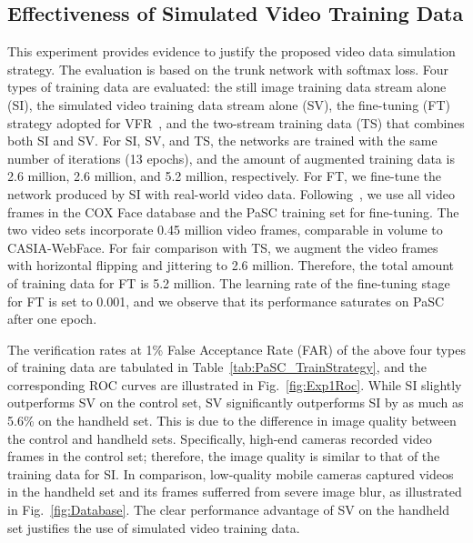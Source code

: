 \documentclass[10pt,journal,cspaper,compsoc]{IEEEtran}
\begin{document}
\subsection{Effectiveness of Simulated Video Training Data}
This experiment provides evidence to justify the proposed video data simulation strategy.
The evaluation is based on the trunk network with softmax loss.
Four types of training data are evaluated: the still image training data stream alone (SI), the simulated video training data stream alone (SV),
the fine-tuning (FT) strategy adopted for VFR~\cite{Ross2015report},
and the two-stream training data (TS) that combines both SI and SV.
For SI, SV, and TS, the networks are trained with the same number of iterations (13 epochs),
and the amount of augmented training data is 2.6 million, 2.6 million, and 5.2 million, respectively.
For FT, we fine-tune the network produced by SI with real-world video data.
Following~\cite{Ross2015report}, we use all video frames in the COX Face database and the PaSC training set for fine-tuning.
The two video sets incorporate 0.45 million video frames, comparable in volume to CASIA-WebFace.
For fair comparison with TS, we augment the video frames with horizontal flipping and jittering to 2.6 million.
Therefore, the total amount of training data for FT is 5.2 million.
The learning rate of the fine-tuning stage for FT is set to 0.001, and we observe that its performance saturates on PaSC after one epoch.

The verification rates at 1\% False Acceptance Rate (FAR) of the above four types of training data are tabulated in Table~\ref{tab:PaSC_TrainStrategy},
and the corresponding ROC curves are illustrated in Fig.~\ref{fig:Exp1Roc}.
While SI slightly outperforms SV on the control set, SV significantly outperforms SI by as much as 5.6\% on the handheld set.
This is due to the difference in image quality between the control and handheld sets.
Specifically, high-end cameras recorded video frames in the control set; therefore, the image quality is similar to that of the training data for SI.
In comparison, low-quality mobile cameras captured videos in the handheld set and its frames sufferred from severe image blur,
as illustrated in Fig.~\ref{fig:Database}.
The clear performance advantage of SV on the handheld set justifies the use of simulated video training data.
\end{document}
